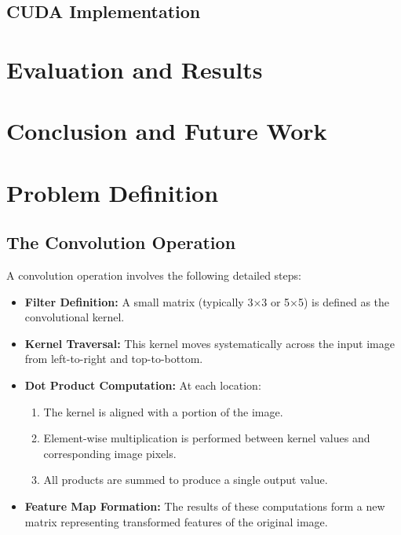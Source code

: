 \documentclass[conference, 10pt]{IEEEtran}
\begin{document}
\subsection{CUDA Implementation}


\section{Evaluation and Results}





\section{Conclusion and Future Work}






\section{Problem Definition}

\subsection{The Convolution Operation}
A convolution operation involves the following detailed steps:

\begin{itemize}
    \item \textbf{Filter Definition:} A small matrix (typically 3×3 or 5×5) is defined as the convolutional kernel.
    \item \textbf{Kernel Traversal:} This kernel moves systematically across the input image from left-to-right and top-to-bottom.
    \item \textbf{Dot Product Computation:} At each location:
    \begin{enumerate}
        \item The kernel is aligned with a portion of the image.
        \item Element-wise multiplication is performed between kernel values and corresponding image pixels.
        \item All products are summed to produce a single output value.
    \end{enumerate}
    \item \textbf{Feature Map Formation:} The results of these computations form a new matrix representing transformed features of the original image.
\end{itemize}
\end{document}

